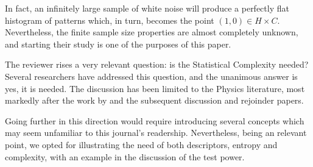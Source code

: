\documentclass[alpha-refs]{wiley-article}
\begin{document}
In fact, an infinitely large sample of white noise will produce a perfectly flat histogram of patterns which, in turn, becomes the point $(1,0)\in H\times C$.
Nevertheless, the finite sample size properties are almost completely unknown, and starting their study is one of the purposes of this paper.

\addtocounter{section}{2}
\addtocounter{subsection}{1}
\addtocounter{subsubsection}{1}
\addtocounter{figure}{11}
The reviewer rises a very relevant question: is the Statistical Complexity needed?
Several researchers have addressed this question, and the unanimous answer is yes, it is needed.
The discussion has been limited to the Physics literature, most markedly after the work by \citet{SimpleMeasureforComplexity} and the subsequent discussion \citep{CommentIonSimpleMeasureforComplexity,CommentIIonSimpleMeasureforComplexity} and rejoinder \citep{ReplytoCommentsonSimpleMeasureforComplexity} papers.

Going further in this direction would require introducing several concepts which may seem unfamiliar to this journal's readership.
Nevertheless, being an relevant point, we opted for illustrating the need of both descriptors, entropy and complexity, with an example in the discussion of the test power.
\end{document}
